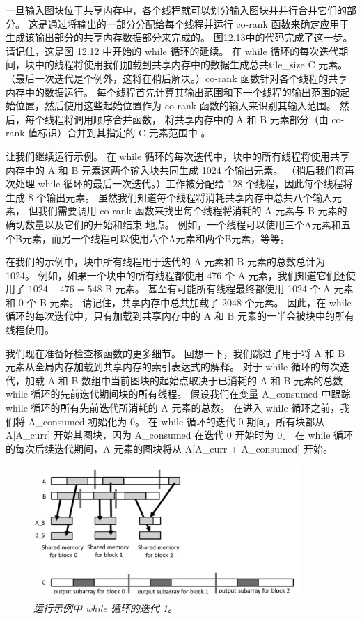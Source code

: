 一旦输入图块位于共享内存中，各个线程就可以划分输入图块并并行合并它们的部分。 
这是通过将输出的一部分分配给每个线程并运行 co-rank 函数来确定应用于生成该输出部分的共享内存数据部分来完成的。 
图12.13中的代码完成了这一步。 请记住，这是图 12.12 中开始的 while 循环的延续。 
在 while 循环的每次迭代期间，块中的线程将使用我们加载到共享内存中的数据生成总共tile\_size $\mathrm{C}$ 元素。 
（最后一次迭代是个例外，这将在稍后解决。）co-rank 函数针对各个线程的共享内存中的数据运行。 
每个线程首先计算其输出范围和下一个线程的输出范围的起始位置，然后使用这些起始位置作为 co-rank 函数的输入来识别其输入范围。 
然后，每个线程将调用顺序合并函数，
将共享内存中的 $\mathrm{A}$ 和 B 元素部分（由 co-rank 值标识）合并到其指定的 $\mathrm{C}$ 元素范围中 。

让我们继续运行示例。 
在 while 循环的每次迭代中，块中的所有线程将使用共享内存中的 A 和 B 元素这两个输入块共同生成 1024 个输出元素。 
（稍后我们将再次处理 while 循环的最后一次迭代。）工作被分配给 128 个线程，因此每个线程将生成 8 个输出元素。 
虽然我们知道每个线程将消耗共享内存中总共八个输入元素，
但我们需要调用 co-rank 函数来找出每个线程将消耗的 A 元素与 B 元素的确切数量以及它们的开始和结束 地点。 
例如，一个线程可以使用三个A元素和五个B元素，而另一个线程可以使用六个A元素和两个B元素，等等。

在我们的示例中，块中所有线程用于迭代的 A 元素和 B 元素的总数总计为 1024。 
例如，如果一个块中的所有线程都使用 476 个 A 元素，我们知道它们还使用了 $1024-476=548$ B 元素。 
甚至有可能所有线程最终都使用 1024 个 A 元素和 0 个 B 元素。 请记住，共享内存中总共加载了 2048 个元素。 
因此，在 while 循环的每次迭代中，只有加载到共享内存中的 A 和 B 元素的一半会被块中的所有线程使用。

我们现在准备好检查核函数的更多细节。 
回想一下，我们跳过了用于将 $\mathrm{A}$ 和 $\mathrm{B}$ 元素从全局内存加载到共享内存的索引表达式的解释。 
对于 while 循环的每次迭代，加载 A 和 B 数组中当前图块的起始点取决于已消耗的 $\mathrm{A}$ 
和 $\mathrm{B}$ 元素的总数 while 循环的先前迭代期间块的所有线程。 
假设我们在变量 A\_consumed 中跟踪 while 循环的所有先前迭代所消耗的 A 元素的总数。 
在进入 while 循环之前，我们将 A\_consumed 初始化为 0。 
在 while 循环的迭代 0 期间，所有块都从 A[A\_curr] 开始其图块，因为 A\_consumed 在迭代 0 开始时为 0。 
在 while 循环的每次后续迭代期间，A 元素的图块将从 A[A\_curr + A\_consumed] 开始。

\begin{figure}[H]
	\centering
	\includegraphics[width=0.9\textwidth]{figs/F12.14.png}
	\caption{\textit{运行示例中 while 循环的迭代 1。}}
\end{figure}

